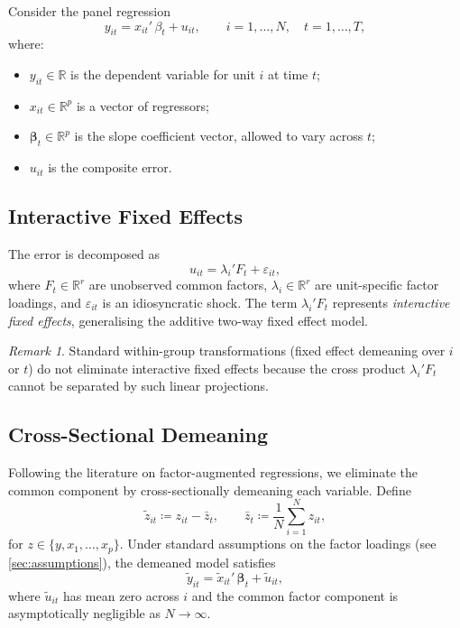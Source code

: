 \documentclass[12pt, a4paper]{article}
\theoremstyle{plain}
\theoremstyle{definition}
\theoremstyle{remark}
\newtheorem{remark}{Remark}[section]
\newcommand{\R}{\mathbb{R}}
\newcommand{\bbeta}{\bm{\beta}}
\begin{document}
\begin{onehalfspacing}
Consider the panel regression
\begin{equation}
  \label{eq:model}
  y_{it} = x_{it}'\,\beta_t + u_{it},
  \qquad i = 1,\ldots,N, \quad t = 1,\ldots,T,
\end{equation}
where:
\begin{itemize}[noitemsep]
  \item $y_{it} \in \R$ is the dependent variable for unit $i$ at time $t$;
  \item $x_{it} \in \R^p$ is a vector of regressors;
  \item $\bbeta_t \in \R^p$ is the slope coefficient vector, allowed to vary
        across $t$;
  \item $u_{it}$ is the composite error.
\end{itemize}

\subsection{Interactive Fixed Effects}
\label{sub:ife}

The error is decomposed as
\begin{equation}
  \label{eq:error}
  u_{it} = \lambda_i' F_t + \varepsilon_{it},
\end{equation}
where $F_t \in \R^r$ are unobserved common factors, $\lambda_i \in \R^r$ are
unit-specific factor loadings, and $\varepsilon_{it}$ is an idiosyncratic
shock.  The term $\lambda_i' F_t$ represents \emph{interactive fixed effects},
generalising the additive two-way fixed effect model.

\begin{remark}
  Standard within-group transformations (fixed effect demeaning over $i$ or
  $t$) do not eliminate interactive fixed effects because the cross product
  $\lambda_i' F_t$ cannot be separated by such linear projections.
\end{remark}

\subsection{Cross-Sectional Demeaning}
\label{sub:demean}

Following the literature on factor-augmented regressions, we eliminate the
common component by cross-sectionally demeaning each variable.  Define
\begin{equation}
  \label{eq:demean}
  \tilde{z}_{it} \coloneqq z_{it} - \bar{z}_t, \qquad
  \bar{z}_t \coloneqq \frac{1}{N}\sum_{i=1}^N z_{it},
\end{equation}
for $z \in \{y, x_1, \ldots, x_p\}$.  Under standard assumptions on the
factor loadings (see \cref{sec:assumptions}), the demeaned model satisfies
\begin{equation}
  \label{eq:demeaned}
  \tilde{y}_{it} = \tilde{x}_{it}'\,\bbeta_t + \tilde{u}_{it},
\end{equation}
where $\tilde{u}_{it}$ has mean zero across $i$ and the common factor
component is asymptotically negligible as $N \to \infty$.


\end{onehalfspacing}
\end{document}
